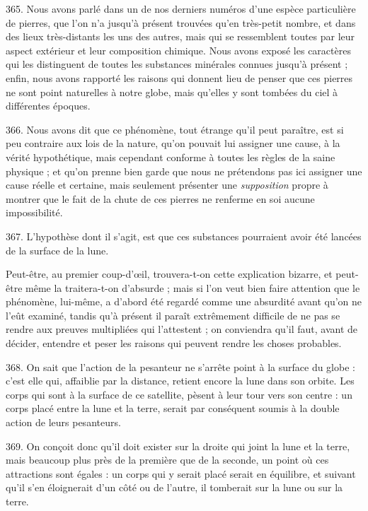 \documentclass[a4paper, 11pt, oneside, polutonikogreek, french]{article}
\begin{document}
365. \og Nous avons parlé dans un de nos derniers numéros d'une espèce particulière de pierres, que l'on n'a jusqu'à présent trouvées qu'en très-petit nombre, et dans des lieux très-distants les uns des autres, mais qui se ressemblent toutes par leur aspect extérieur et leur composition chimique. Nous avons exposé les caractères qui les distinguent de toutes les substances minérales connues jusqu'à présent ; enfin, nous avons rapporté les raisons qui donnent lieu de penser que ces pierres ne sont point naturelles à notre globe, mais qu'elles y sont tombées du ciel à différentes époques. \fg

366. \og Nous avons dit que ce phénomène, tout étrange qu'il peut paraître, est si peu contraire aux lois de la nature, qu'on pouvait lui assigner une cause, à la vérité hypothétique, mais cependant conforme à toutes les règles de la saine physique ; et qu'on prenne bien garde que nous ne prétendons pas ici assigner une cause réelle et certaine, mais seulement présenter une \emph{supposition} propre à montrer que le fait de la chute de ces pierres ne renferme en soi aucune impossibilité. \fg

367. L'hypothèse dont il s'agit, est que ces substances pourraient avoir été lancées de la surface de la lune.

Peut-être, au premier coup-d'œil, trouvera-t-on cette explication bizarre, et peut-être même la traitera-t-on d'absurde ; mais si l'on veut bien faire attention que le phénomène, lui-même, a d'abord été regardé comme une absurdité avant qu'on ne l'eût examiné, tandis qu'à présent il paraît extrêmement difficile de ne pas se rendre aux preuves multipliées qui l'attestent ; on conviendra qu'il faut, avant de décider, entendre et peser les raisons qui peuvent rendre les choses probables.

368. On sait que l'action de la pesanteur ne s'arrête point à la surface du globe : c'est elle qui, affaiblie par la distance, retient encore la lune dans son orbite. Les corps qui sont à la surface de ce satellite, pèsent à leur tour vers son centre : un corps placé entre la lune et la terre, serait par conséquent soumis à la double action de leurs pesanteurs.

369. On conçoit donc qu'il doit exister sur la droite qui joint la lune et la terre, mais beaucoup plus près de la première que de la seconde, un point où ces attractions sont égales : un corps qui y serait placé serait en équilibre, et suivant qu'il s'en éloignerait d'un côté ou de l'autre, il tomberait sur la lune ou sur la terre.
\end{document}
